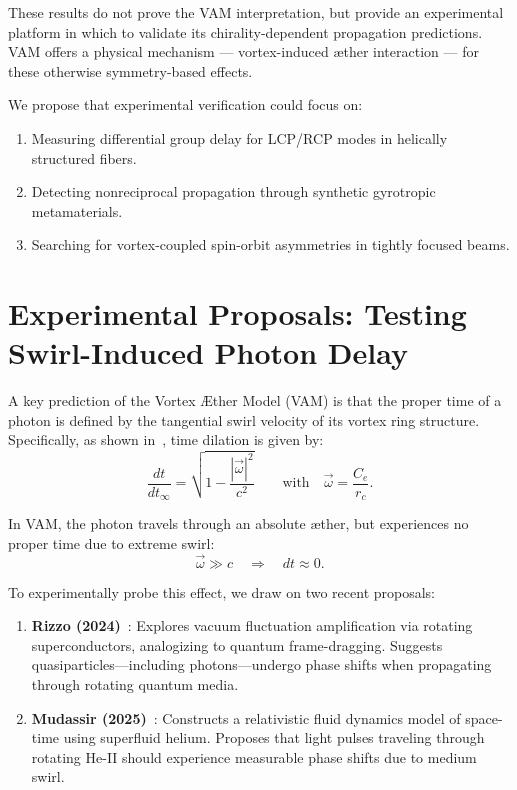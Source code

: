         These results do not prove the VAM interpretation, but provide an experimental platform in which to validate its chirality-dependent propagation predictions. VAM offers a physical mechanism — vortex-induced æther interaction — for these otherwise symmetry-based effects.

        We propose that experimental verification could focus on:
        \begin{enumerate}
            \item Measuring differential group delay for LCP/RCP modes in helically structured fibers.
            \item Detecting nonreciprocal propagation through synthetic gyrotropic metamaterials.
            \item Searching for vortex-coupled spin-orbit asymmetries in tightly focused beams.
        \end{enumerate}


\section{Experimental Proposals: Testing Swirl-Induced Photon Delay}\label{sec:swirl-delay-exp}

        A key prediction of the Vortex \AE ther Model (VAM) is that the proper time of a photon is defined by the tangential swirl velocity of its vortex ring structure. Specifically, as shown in~\cite{VAM-1}, time dilation is given by:
        \begin{equation}
            \frac{dt}{dt_\infty} = \sqrt{1 - \frac{|\vec{\omega}|^2}{c^2}} \qquad \text{with} \quad \vec{\omega} = \frac{C_e}{r_c}.
        \end{equation}

        In VAM, the photon travels through an absolute æther, but experiences no proper time due to extreme swirl:
        \[
            \vec{\omega} \gg c \quad \Rightarrow \quad dt \approx 0.
        \]

        To experimentally probe this effect, we draw on two recent proposals:

        \begin{enumerate}
            \item \textbf{Rizzo (2024)}~\cite{rizzo2024rotating}: Explores vacuum fluctuation amplification via rotating superconductors, analogizing to quantum frame-dragging. Suggests quasiparticles—including photons—undergo phase shifts when propagating through rotating quantum media.

            \item \textbf{Mudassir (2025)}~\cite{mudassir2025fluid}: Constructs a relativistic fluid dynamics model of space-time using superfluid helium. Proposes that light pulses traveling through rotating He-II should experience measurable phase shifts due to medium swirl.
        \end{enumerate}

